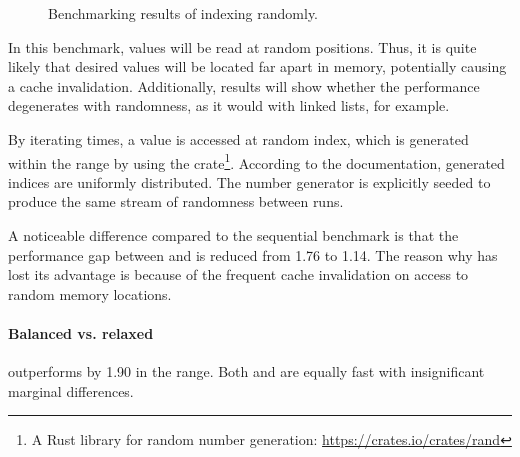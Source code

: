 \begin{figure}[t]

    \caption{Benchmarking results of indexing randomly.}
    \label{fig:index-randomly}
\end{figure}

In this benchmark, values will be read at random positions. Thus, it is quite likely that desired values will be located far apart in memory, potentially causing a cache invalidation. Additionally, results will show whether the performance degenerates with randomness, as it would with linked lists, for example.

By iterating \n{} times, a value is accessed at random index, which is generated within the \range{[0, N)} range by using the  crate\footnote{A Rust library for random number generation: \url{https://crates.io/crates/rand}}. According to the  documentation, generated indices are uniformly distributed. The number generator is explicitly seeded to produce the same stream of randomness between runs.

A noticeable difference compared to the sequential benchmark is that the performance gap between \pvec{} and \stdvec{} is reduced from 1.76 to 1.14. The reason why \stdvec{} has lost its advantage is because of the frequent cache invalidation on access to random memory locations.

\paragraph{Balanced vs. relaxed}
\rbvec{} outperforms \rrbvec{} by 1.90 in the \range{[100, \mega{1}]} range. Both \rrbvec{} and \imrsvec{} are equally fast with insignificant marginal differences.

